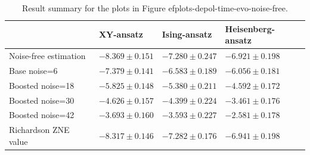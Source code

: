 \begin{table}[h]
\caption{Result summary for the plots in Figure 
ef{plots-depol-time-evo-noise-free}.}
\begin{tabular}{@{}llll@{}}
\toprule
  & XY-ansatz  & Ising-ansatz  & Heisenberg-ansatz\\
\midrule
Noise-free estimation & $-8.369 \pm 0.151$ & $-7.280 \pm 0.247$ & $-6.921 \pm 0.198$ \\
\midrule
Base noise=6 & $-7.379 \pm 0.141$ & $-6.583 \pm 0.189$ & $-6.056 \pm 0.181$ \\
Boosted noise=18 & $-5.825 \pm 0.148$ & $-5.380 \pm 0.211$ & $-4.592 \pm 0.172$ \\
Boosted noise=30 & $-4.626 \pm 0.157$ & $-4.399 \pm 0.224$ & $-3.461 \pm 0.176$ \\
Boosted noise=42 & $-3.693 \pm 0.160$ & $-3.593 \pm 0.227$ & $-2.581 \pm 0.178$ \\
\midrule
Richardson ZNE value & $-8.317 \pm 0.146$ & $-7.282 \pm 0.176$ & $-6.941 \pm 0.198$ \\
\bottomrule
\end{tabular}
\label{table-depol-time-evonoise-free}
\end{table}
